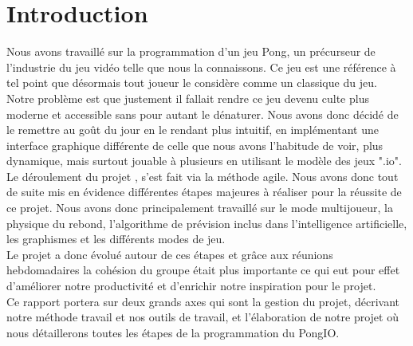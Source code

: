 \chapter*{Introduction}
\label{chap:introduction}

Nous avons travaillé sur la programmation d'un jeu Pong, un précurseur de l'industrie du jeu vidéo telle que nous la connaissons. Ce jeu est une référence à tel point que désormais tout joueur le considère comme un classique du jeu. Notre problème est que justement il fallait rendre ce jeu devenu culte plus moderne et accessible sans pour autant le dénaturer. Nous avons donc décidé de le remettre au goût du jour en le rendant plus intuitif, en implémentant une interface graphique différente de celle que nous avons l'habitude de voir, plus dynamique, mais surtout jouable à plusieurs en utilisant le modèle des jeux ".io". Le déroulement du projet , s'est fait via la méthode agile. Nous avons donc tout de suite mis en évidence différentes étapes majeures à réaliser pour la réussite de ce projet. Nous avons donc principalement travaillé sur le mode multijoueur, la physique du rebond, l'algorithme de prévision inclus dans l'intelligence artificielle, les graphismes et les différents modes de jeu.\\
Le projet a donc évolué autour de ces étapes et grâce aux réunions hebdomadaires la cohésion du groupe était plus importante ce qui eut pour effet d'améliorer notre productivité et d'enrichir notre inspiration pour le projet.\\
Ce rapport portera sur deux grands axes qui sont la gestion du projet, décrivant notre méthode travail et nos outils de travail, et l'élaboration de notre projet où nous détaillerons toutes les étapes de la programmation du PongIO.
